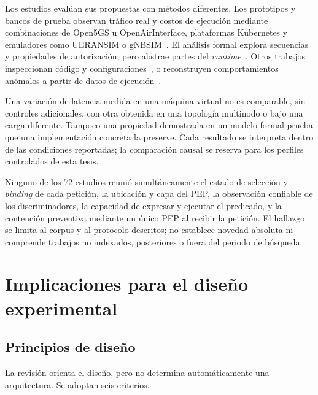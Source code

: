 Los estudios evalúan sus propuestas con métodos diferentes. Los prototipos y bancos de prueba observan tráfico real y costos de ejecución mediante combinaciones de Open5GS u OpenAirInterface, plataformas Kubernetes y emuladores como UERANSIM o gNBSIM~\cite{E0004,E0019,E0069,E0196}. El análisis formal explora secuencias y propiedades de autorización, pero abstrae partes del \textit{runtime}~\cite{E0066,E0036}. Otros trabajos inspeccionan código y configuraciones~\cite{E0030,E0566}, o reconstruyen comportamientos anómalos a partir de datos de ejecución~\cite{E0100,E0200}.

Una variación de latencia medida en una máquina virtual no es comparable, sin controles adicionales, con otra obtenida en una topología multinodo o bajo una carga diferente. Tampoco una propiedad demostrada en un modelo formal prueba que una implementación concreta la preserve. Cada resultado se interpreta dentro de las condiciones reportadas; la comparación causal se reserva para los perfiles controlados de esta tesis.

Ninguno de los 72 estudios reunió simultáneamente el estado de selección y \textit{binding} de cada petición, la ubicación y capa del PEP, la observación confiable de los discriminadores, la capacidad de expresar y ejecutar el predicado, y la contención preventiva mediante un único PEP al recibir la petición. El hallazgo se limita al corpus y al protocolo descritos; no establece novedad absoluta ni comprende trabajos no indexados, posteriores o fuera del periodo de búsqueda.

\section{Implicaciones para el diseño experimental}
\label{sec:criterios-diseno}

\subsection{Principios de diseño}
\label{subsec:criterios-derivados}

La revisión orienta el diseño, pero no determina automáticamente una arquitectura. Se adoptan seis criterios.

